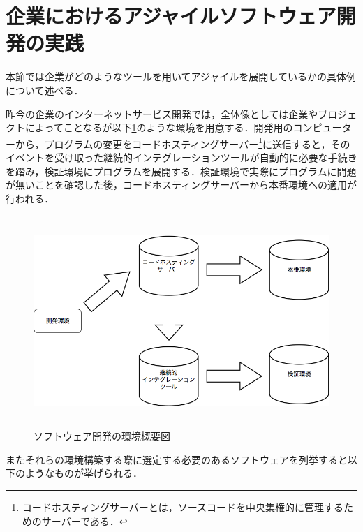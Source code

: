 \section{企業におけるアジャイルソフトウェア開発の実践}

本節では企業がどのようなツールを用いてアジャイルを展開しているかの具体例について述べる．

昨今の企業のインターネットサービス開発では，全体像としては企業やプロジェクトによってことなるが以下\ref{fig:dev_env}のような環境を用意する．開発用のコンピューターから，プログラムの変更をコードホスティングサーバー\footnote{コードホスティングサーバーとは，ソースコードを中央集権的に管理するためのサーバーである．}に送信すると，そのイベントを受け取った継続的インテグレーションツールが自動的に必要な手続きを踏み，検証環境にプログラムを展開する．検証環境で実際にプログラムに問題が無いことを確認した後，コードホスティングサーバーから本番環境への適用が行われる．

\begin{figure}[H]
\centering
\includegraphics[height=8cm]{./assets/images/dev_env.png}
\caption{ソフトウェア開発の環境概要図}
\label{fig:dev_env}
\end{figure}

またそれらの環境構築する際に選定する必要のあるソフトウェアを列挙すると以下のようなものが挙げられる．

